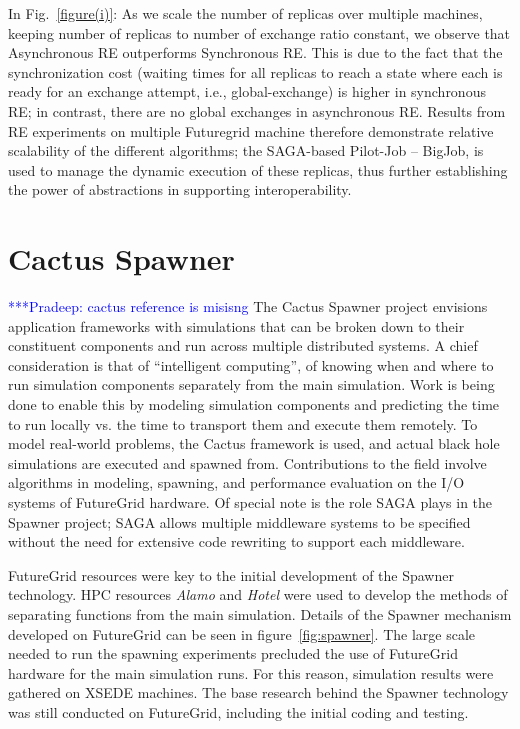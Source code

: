 \documentclass[]{paper}
\newcommand{\pmnote}[1]{ {\textcolor{blue} { ***Pradeep: #1 }}}
\newcommand{\mrnote}[1]{ {\textcolor{cyan} { ***Melissa: #1 }}}
\newcommand{\pmnote}[1]{}
\newcommand{\mrnote}[1]{}
\begin{document}
In Fig.~\ref{figure(i)}: As we scale the number of replicas over multiple machines, keeping number of replicas to number of exchange ratio constant, we observe that Asynchronous RE outperforms Synchronous RE. This is due to the fact that the synchronization cost (waiting times for all replicas to reach a state where each is ready for an exchange attempt, i.e., global-exchange) is higher in synchronous RE; in contrast, there are no global exchanges in asynchronous RE.  Results from RE experiments on multiple Futuregrid machine therefore demonstrate relative scalability of the different algorithms; the SAGA-based Pilot-Job -- BigJob, is used to manage the dynamic execution of these replicas, thus further establishing the power of abstractions in supporting interoperability.


\section{Cactus Spawner}
\pmnote{cactus reference is misisng}
The Cactus Spawner project envisions application frameworks with simulations that can be broken down to their constituent components and run across multiple distributed systems.  A chief consideration is that of ``intelligent computing'', of knowing when and where to run simulation components separately from the main simulation.  Work is being done to enable this by modeling simulation components and predicting the time to run locally vs. the time to transport them and execute them remotely.  To model real-world problems, the Cactus framework is used, and actual black hole simulations are executed and spawned from.  Contributions to the field involve algorithms in modeling, spawning, and performance evaluation on the I/O systems of FutureGrid hardware.  Of special note is the role SAGA plays in the Spawner project; SAGA allows multiple middleware systems to be specified without the need for extensive code rewriting to support each middleware.

FutureGrid resources were key to the initial development of the Spawner technology.  HPC resources \textit{Alamo} and \textit{Hotel} were used to develop the methods of separating functions from the main simulation. Details of the Spawner mechanism developed on FutureGrid can be seen in figure~\ref{fig:spawner}.  The large scale needed to run the spawning experiments precluded the use of FutureGrid hardware for the main simulation runs.  For this reason, simulation results were gathered on XSEDE machines.  The base research behind the Spawner technology was still conducted on FutureGrid, including the initial coding and testing.
\end{document}
